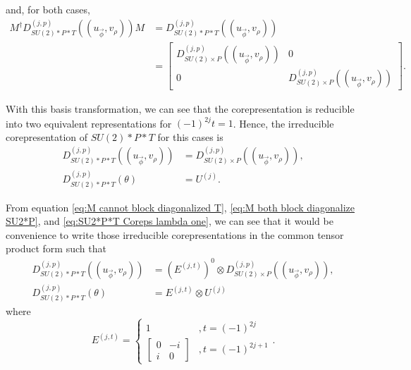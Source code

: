 \documentclass[preprint, 12pt]{revtex4-2}
\numberwithin{equation}{section}
\begin{document}
and, for both cases,
\begin{equation}\label{eq:M both block diagonalize SU2*P}
    \begin{aligned}
        M^\dagger D_{SU(2)\ast P\ast T}^{(j,p)}((u_{\vec{\phi}}, v_\rho))M &= D_{SU(2)\ast P\ast T}^{(j,p)}((u_{\vec{\phi}}, v_\rho)) \\
        &= \begin{bmatrix}
        D_{SU(2)\times P}^{(j,p)}((u_{\vec{\phi}}, v_\rho)) & 0 \\
            0 & D_{SU(2)\times P}^{(j,p)}((u_{\vec{\phi}}, v_\rho))  
        \end{bmatrix}.
    \end{aligned}
\end{equation}

With this basis transformation, we can see that the corepresentation is reducible into two equivalent representations for $(-1)^{2j}t=1$. Hence, the irreducible corepresentation of $SU(2)\ast P\ast T$ for this cases is
\begin{equation}\label{eq:SU2*P*T Coreps lambda one}
    \begin{aligned}
        D_{SU(2)\ast P\ast T}^{(j,p)}((u_{\vec{\phi}}, v_\rho))
        &= D_{SU(2)\times P}^{(j,p)}((u_{\vec{\phi}}, v_\rho)), \\
        D_{SU(2)\ast P\ast T}^{(j,p)}(\theta) 
        &= U^{(j)}.
    \end{aligned}
\end{equation}

From equation \ref{eq:M cannot block diagonalized T}, \ref{eq:M both block diagonalize SU2*P}, and \ref{eq:SU2*P*T Coreps lambda one}, we can see that it would be convenience to write those irreducible corepresentations in the common tensor product form such that
\begin{equation}\label{eq:SU2*P*T Coreps generalized}
    \begin{aligned}
        D_{SU(2)\ast P\ast T}^{(j,p)}((u_{\vec{\phi}}, v_\rho))
        &= \left(E^{(j,t)}\right)^0\otimes D_{SU(2)\times P}^{(j,p)}((u_{\vec{\phi}}, v_\rho)), \\
        D_{SU(2)\ast P\ast T}^{(j,p)}(\theta) 
        &= E^{(j,t)}\otimes U^{(j)}
    \end{aligned}
\end{equation}
where
\begin{equation}\label{eq:E}
    E^{(j,t)} = \begin{cases}
        1 &, t = (-1)^{2j} \\
        \begin{bmatrix}0&-i\\i&0\end{bmatrix} &, t = (-1)^{2j+1}
    \end{cases}.
\end{equation}
\end{document}

